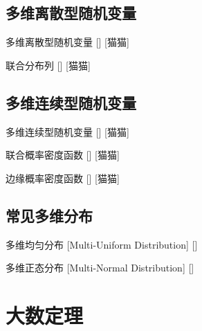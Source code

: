 \documentclass[UTF8]{ctexart}
\begin{document}
        \begin{ppt}
            {}
        \end{ppt}

    \subsection{多维离散型随机变量}

        \begin{dfn}
            []
            {多维离散型随机变量}
            []
            [猫猫]
        \end{dfn}

        \begin{dfn}
            []
            {联合分布列}
            []
            [猫猫]
        \end{dfn}

    \subsection{多维连续型随机变量}

        \begin{dfn}
            []
            {多维连续型随机变量}
            []
            [猫猫]
        \end{dfn}

        \begin{dfn}
            []
            {联合概率密度函数}
            []
            [猫猫]
        \end{dfn}

        \begin{dfn}
            []
            {边缘概率密度函数}
            []
            [猫猫]
        \end{dfn}

    \subsection{常见多维分布}

        \begin{xmp}
            []
            {多维均匀分布}
            [Multi-Uniform Distribution]
            []
        \end{xmp}

        \begin{xmp}
            []
            {多维正态分布}
            [Multi-Normal Distribution]
            []
        \end{xmp}

\section{大数定理}
\end{document}

